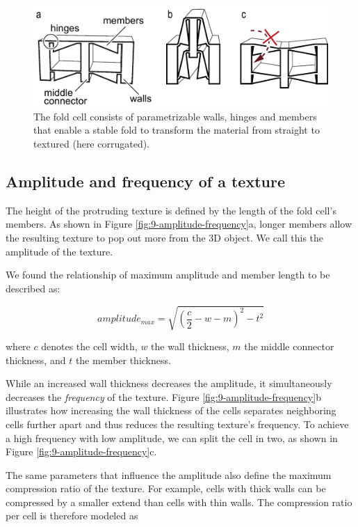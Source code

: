 \begin{figure} [h]  
    \includegraphics[width=\textwidth]{chapters/metamaterial-textures-FIG/8-basic-texture-cell.pdf}
    \caption[Short figure name.]{The fold cell consists of parametrizable walls, hinges and members that enable a stable fold to transform the material from straight to textured (here corrugated).
    \label{fig:8-basic-texture-cell}}
\end{figure}


\subsection{Amplitude and frequency of a texture}
\label{section:amplitude-textures}

The height of the protruding texture is defined by the length of the fold cell’s members. As shown in Figure \ref{fig:9-amplitude-frequency}a, longer members allow the resulting texture to pop out more from the 3D object. We call this the amplitude of the texture.

We found the relationship of maximum amplitude and member length to be described as:

\[
    amplitude_{max} = \sqrt{\left(\frac{c}{2}-w-m \right)^2 - t^2}
\]

where $c$ denotes the cell width, $w$ the wall thickness, $m$ the middle connector thickness, and $t$ the member thickness.

While an increased wall thickness decreases the amplitude, it simultaneously decreases the \textit{frequency} of the texture. Figure \ref{fig:9-amplitude-frequency}b illustrates how increasing the wall thickness of the cells separates neighboring cells further apart and thus reduces the resulting texture’s frequency. To achieve a high frequency with low amplitude, we can split the cell in two, as shown in Figure \ref{fig:9-amplitude-frequency}c.

The same parameters that influence the amplitude also define the maximum compression ratio of the texture. For example, cells with thick walls can be compressed by a smaller extend than cells with thin walls. The compression ratio per cell is therefore modeled as


